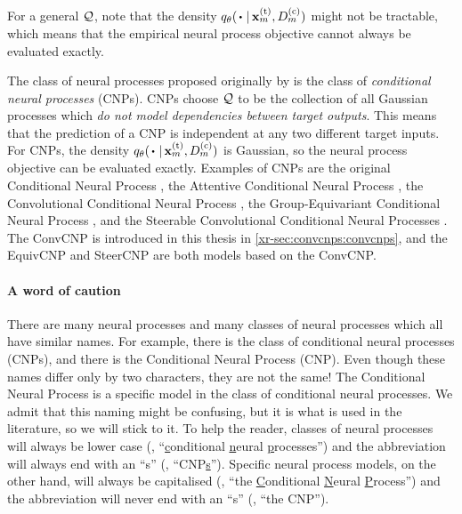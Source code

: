\documentclass[12pt, twoside]{report}
\newcommand{\xrprefix}[1]{xr-#1}
\begin{document}
For a general $\mathcal{Q}$, note that the density $q_\theta(\vardot \cond \vx\us{(t)}_m, D\us{(c)}_m)$ might not be tractable, which means that the empirical neural process objective cannot always be evaluated exactly.

The class of neural processes proposed originally by \textcite{Garnelo:2018:Conditional_Neural_Processes} is the class of \emph{conditional neural processes} (CNPs).
CNPs choose $\mathcal{Q}$ to be the collection of all Gaussian processes which \emph{do not model dependencies between target outputs}.
This means that the prediction of a CNP is independent at any two different target inputs.
%
For CNPs, the density $q_\theta(\vardot \cond \vx\us{(t)}_m, D\us{(c)}_m)$ is Gaussian, so the neural process objective can be evaluated exactly.
Examples of CNPs are the original Conditional Neural Process \parencite[CNP;][]{Garnelo:2018:Conditional_Neural_Processes}, the Attentive Conditional Neural Process \parencite[ACNP;][]{Kim:2019:Attentive_Neural_Processes}, the Convolutional Conditional Neural Process \parencite[ConvCNP; \cref{\xrprefix{sec:convcnps:convcnps}};][]{Gordon:2020:Convolutional_Conditional_Neural_Processes}, the Group-Equivariant Conditional Neural Process \parencite[EquivCNP;][]{Kawano:2021:Group_Equivariant_Conditional_Neural_processes}, and the Steerable Convolutional Conditional Neural Processes \parencite[SteerCNP;][]{Holderrieth:2021:Equivariant_Learning_of_Stochastic_Fields}.
The ConvCNP is introduced in this thesis in \cref{\xrprefix{sec:convcnps:convcnps}},
and the EquivCNP and SteerCNP are both models based on the ConvCNP.

\paragraph{A word of caution}
There are many neural processes and many classes of neural processes which all have similar names.
For example, there is the class of conditional neural processes (CNPs), and there is the Conditional Neural Process (CNP).
Even though these names differ only by two characters, they are not the same!
The Conditional Neural Process is a specific model in the class of conditional neural processes.
We admit that this naming might be confusing, but it is what is used in the literature, so we will stick to it.
To help the reader, classes of neural processes will always be lower case (\eg, ``\underline{c}onditional \underline{n}eural \underline{p}rocesses'') and the abbreviation will always end with an ``s'' (\eg, ``CNP\underline{s}'').
Specific neural process models, on the other hand, will always be capitalised (\eg, ``the \underline{C}onditional \underline{N}eural \underline{P}rocess'') and the abbreviation will never end with an ``s'' (\eg, ``the CNP'').
\end{document}
